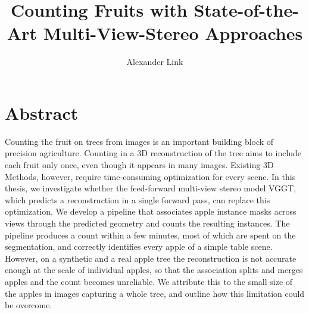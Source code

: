 \documentclass[english, egger, bsc]{vcethesis}
\title{Counting Fruits with State-of-the-Art Multi-View-Stereo Approaches}
\author{Alexander Link}
\begin{document}
\prepages
\maketitle
\cleardoublepage
\chapter*{Abstract}
Counting the fruit on trees from images is an important building block of precision agriculture. Counting in a 3D reconstruction of the tree aims to include each fruit only once, even though it appears in many images. Existing 3D Methods, however, require time-consuming optimization for every scene. In this thesis, we investigate whether the feed-forward multi-view stereo model VGGT, which predicts a reconstruction in a single forward pass, can replace this optimization. We develop a pipeline that associates apple instance masks across views through the predicted geometry and counts the resulting instances. The pipeline produces a count within a few minutes, most of which are spent on the segmentation, and correctly identifies every apple of a simple table scene. However, on a synthetic and a real apple tree the reconstruction is not accurate enough at the scale of individual apples, so that the association splits and merges apples and the count becomes unreliable. We attribute this to the small size of the apples in images capturing a whole tree, and outline how this limitation could be overcome.
\tableofcontents
\cleardoublepage
\mainbody

\end{document}
